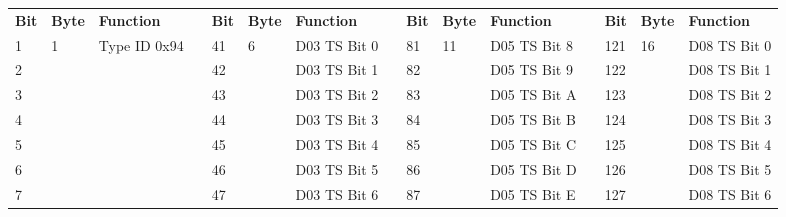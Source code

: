 \documentclass[]{article}
\begin{document}
\begin{landscape}
	\begin{table}[]
		\footnotesize
		\begin{tabular}{lllllllllllllll}
			\cline{1-3} \cline{5-7} \cline{9-11} \cline{13-15}
			\textbf{Bit} & \textbf{Byte}      & \textbf{Function}             & \multirow{9}{*}{} & \textbf{Bit} & \textbf{Byte}       & \textbf{Function} &  & \textbf{Bit} & \textbf{Byte}       & \textbf{Function} &  & \textbf{Bit} & \textbf{Byte}       & \textbf{Function} \\ \cline{1-3} \cline{5-7} \cline{9-11} \cline{13-15} 
			1            & \multirow{8}{*}{1} & \multirow{8}{*}{Type ID 0x94} &                   & 41           & \multirow{8}{*}{6}  & D03 TS Bit 0      &  & 81           & \multirow{8}{*}{11} & D05 TS Bit 8      &  & 121          & \multirow{8}{*}{16} & D08 TS Bit 0      \\
			2            &                    &                               &                   & 42           &                     & D03 TS Bit 1      &  & 82           &                     & D05 TS Bit 9      &  & 122          &                     & D08 TS Bit 1      \\
			3            &                    &                               &                   & 43           &                     & D03 TS Bit 2      &  & 83           &                     & D05 TS Bit A      &  & 123          &                     & D08 TS Bit 2      \\
			4            &                    &                               &                   & 44           &                     & D03 TS Bit 3      &  & 84           &                     & D05 TS Bit B      &  & 124          &                     & D08 TS Bit 3      \\
			5            &                    &                               &                   & 45           &                     & D03 TS Bit 4      &  & 85           &                     & D05 TS Bit C      &  & 125          &                     & D08 TS Bit 4      \\
			6            &                    &                               &                   & 46           &                     & D03 TS Bit 5      &  & 86           &                     & D05 TS Bit D      &  & 126          &                     & D08 TS Bit 5      \\
			7            &                    &                               &                   & 47           &                     & D03 TS Bit 6      &  & 87           &                     & D05 TS Bit E      &  & 127          &                     & D08 TS Bit 6      \\

\end{tabular}
\end{table}
\end{landscape}
\end{document}

